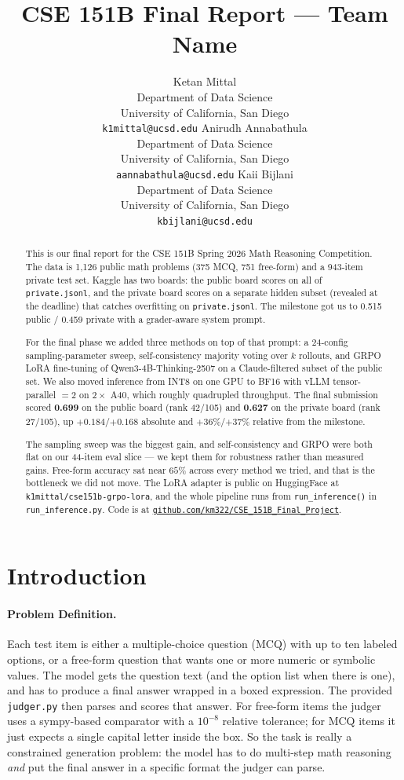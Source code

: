\documentclass{article}
\title{CSE 151B Final Report --- Team Name}
\author{%
  Ketan Mittal \\
  Department of Data Science \\
  University of California, San Diego \\
  \texttt{k1mittal@ucsd.edu}
  \And
  Anirudh Annabathula \\
  Department of Data Science \\
  University of California, San Diego \\
  \texttt{aannabathula@ucsd.edu}
  \And
  Kaii Bijlani \\
  Department of Data Science \\
  University of California, San Diego \\
  \texttt{kbijlani@ucsd.edu}
}
\begin{document}
\maketitle


\begin{abstract}
This is our final report for the CSE 151B Spring 2026 Math Reasoning
Competition. The data is 1{,}126 public math problems (375 MCQ,
751 free-form) and a 943-item private test set. Kaggle has two
boards: the public board scores on all of \texttt{private.jsonl},
and the private board scores on a separate hidden subset (revealed
at the deadline) that catches overfitting on \texttt{private.jsonl}.
The milestone got us to 0.515 public / 0.459 private with a
grader-aware system prompt.

For the final phase we added three methods on top of that prompt:
a 24-config sampling-parameter sweep, self-consistency majority
voting over $k$ rollouts, and GRPO LoRA fine-tuning of
Qwen3-4B-Thinking-2507 on a Claude-filtered subset of the public
set. We also moved inference from INT8 on one GPU to BF16 with vLLM
tensor-parallel $=2$ on $2\times$ A40, which roughly quadrupled
throughput. The final submission scored \textbf{0.699} on the
public board (rank 42/105) and \textbf{0.627} on the private
board (rank 27/105), up $+0.184$/$+0.168$ absolute and
$+36\%$/$+37\%$ relative from the milestone.

The sampling sweep was the biggest
gain, and self-consistency and GRPO were both flat on our 44-item
eval slice --- we kept them for robustness rather than measured
gains. Free-form accuracy sat near $65\%$ across every method we
tried, and that is the bottleneck we did not move. The LoRA adapter
is public on HuggingFace at \texttt{k1mittal/cse151b-grpo-lora},
and the whole pipeline runs from \texttt{run\_inference()} in
\texttt{run\_inference.py}. Code is at
\href{https://github.com/km322/CSE_151B_Final_Project}{\texttt{github.com/km322/CSE\_151B\_Final\_Project}}.
\end{abstract}


\section{Introduction}
\label{sec:intro}

\paragraph{Problem Definition.}
Each test item is either a multiple-choice question (MCQ) with up to
ten labeled options, or a free-form question that wants one or more
numeric or symbolic values. The model gets the question text (and
the option list when there is one), and has to produce a final
answer wrapped in a boxed expression. The provided
\texttt{judger.py} then parses and scores that answer. For
free-form items the judger uses a sympy-based comparator with a
$10^{-8}$ relative tolerance; for MCQ items it just expects a
single capital letter inside the box. So the task is really a
constrained generation problem: the model has to do multi-step
math reasoning \emph{and} put the final answer in a specific
format the judger can parse.
\end{document}
